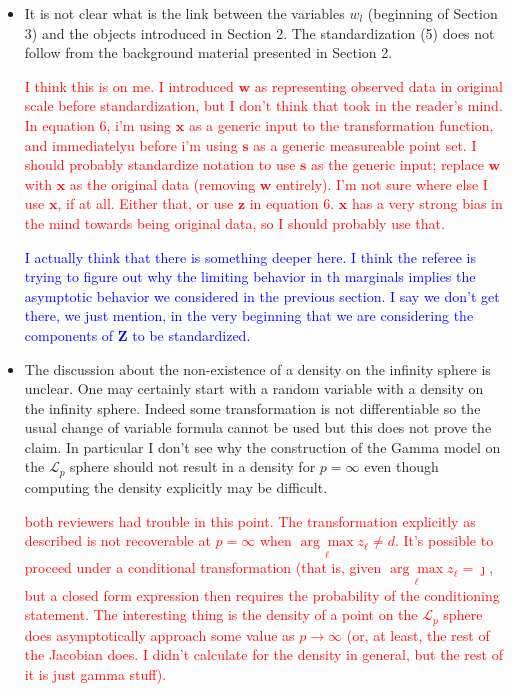 \documentclass[10pt]{article}
\newcommand{\bruno}[1]{\textcolor{blue}{#1}} %
\newcommand{\peter}[1]{\textcolor{red}{#1}}  %
\begin{document}
\begin{itemize}
    \item  It is not clear what is the link between the variables $w_l$ (beginning of Section 3) and the objects introduced in Section 2. The standardization (5) does not follow from the background material presented in Section 2.
    
    \peter{I think this is on me.  I introduced $\bm{w}$ as representing observed data in original scale before standardization, but I don't think that took in the reader's mind.  In equation 6, i'm using $\bm{x}$ as a generic input to the transformation function, and immediatelyu before i'm using $\bm{s}$ as a generic measureable point set.  I should probably standardize notation to use $\bm{s}$ as the generic input; replace $\bm{w}$ with $\bm{x}$ as the original data (removing $\bm{w}$ entirely).  I'm not sure where else I use $\bm{x}$, if at all.  Either that, or use $\bm{z}$ in equation 6.  $\bm{x}$ has a very strong bias in the mind towards being original data, so I should probably use that.}
    
    \bruno{I actually think that there is something deeper here. I think the referee is trying to figure out why the limiting behavior in th marginals implies the asymptotic behavior we considered in the previous section. I say we don't get there, we just mention, in the very beginning that we are considering the components of $\bm{Z}$ to be standardized.}
    
    \item  The discussion about the non-existence of a density on the infinity sphere is unclear. One may certainly start with a random variable with a density on the infinity sphere. Indeed some transformation is not differentiable so the usual change of variable formula cannot be used but this does not prove the claim. In particular I don’t see why the construction of the Gamma model on the $\mathcal{L}_p$ sphere should not result in a density for $p = \infty$ even though computing the density explicitly may be difficult.
    
    \peter{both reviewers had trouble in this point.  The transformation explicitly as described is not recoverable at $p = \infty$ when $\underset{\ell}{\arg\max}z_{\ell} \neq d$.  It's possible to proceed under a conditional transformation (that is, given $\underset{\ell}{\arg\max}z_{\ell} = \jmath$, but a closed form expression then requires the probability of the conditioning statement.  The interesting thing is the density of a point on the $\mathcal{L}_p$ sphere does asymptotically approach some value as $p\to\infty$ (or, at least, the rest of the Jacobian does.  I didn't calculate for the density in general, but the rest of it is just gamma stuff).}
    

\end{itemize}
\end{document}

